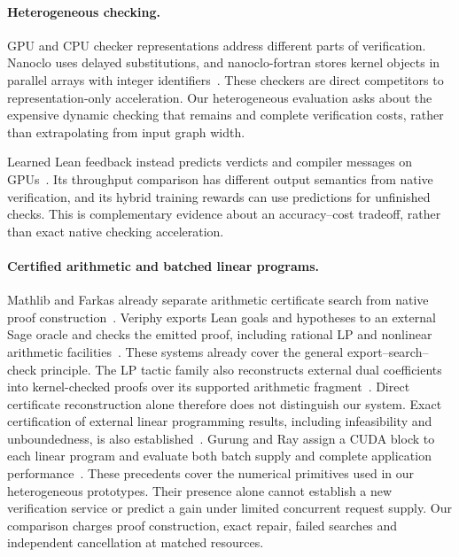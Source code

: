 \documentclass[10pt,twocolumn]{article}
\begin{document}
\paragraph{Heterogeneous checking.}
GPU and CPU checker representations address different parts of verification. Nanoclo uses delayed substitutions, and nanoclo-fortran stores kernel objects in parallel arrays with integer identifiers~\cite{nanoclo,nanocloFortran}. These checkers are direct competitors to representation-only acceleration. Our heterogeneous evaluation asks about the expensive dynamic checking that remains and complete verification costs, rather than extrapolating from input graph width.


Learned Lean feedback instead predicts verdicts and compiler messages on
GPUs~\cite{learnedLeanFeedback}. Its throughput comparison has different output
semantics from native verification, and its hybrid training rewards can use
predictions for unfinished checks. This is complementary evidence about an
accuracy--cost tradeoff, rather than exact native checking acceleration.


\paragraph{Certified arithmetic and batched linear programs.}
Mathlib and Farkas already separate arithmetic certificate search from native
proof construction~\cite{farkasSource}. Veriphy exports Lean goals and hypotheses
to an external Sage oracle and checks the emitted proof, including rational
LP and nonlinear arithmetic facilities~\cite{veriphySource}. These systems
already cover the general export--search--check principle.
The LP tactic family also reconstructs external dual coefficients into
kernel-checked proofs over its supported arithmetic fragment~\cite{lpTacticSource}.
Direct certificate reconstruction alone therefore does not distinguish our system.
Exact certification of external linear
programming results, including infeasibility and unboundedness, is also
established~\cite{verifiedLP2025}. Gurung and Ray assign a CUDA block to each
linear program and evaluate both batch supply and complete application
performance~\cite{batchedLPGPU2019}. These precedents cover the numerical
primitives used in our heterogeneous prototypes. Their presence alone cannot
establish a new verification service or predict a gain under limited
concurrent request supply. Our comparison charges proof construction, exact
repair, failed searches and independent cancellation at matched resources.
\end{document}
